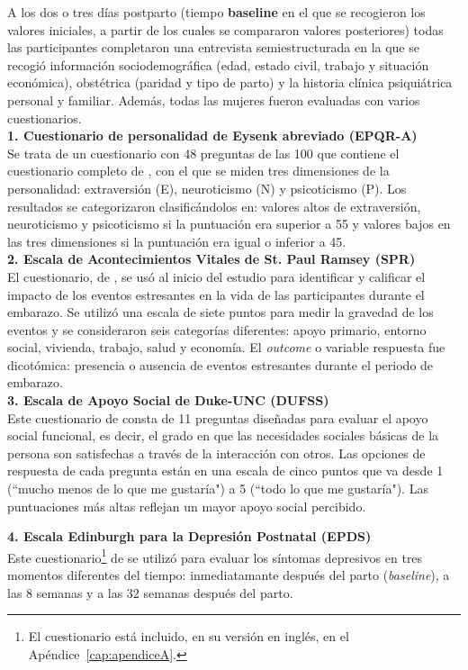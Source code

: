 A los dos o tres días postparto (tiempo \textbf{baseline} en el que se recogieron los valores iniciales, a partir de los cuales se compararon valores posteriores) todas las participantes completaron una entrevista semiestructurada en la que se recogió información sociodemográfica (edad, estado civil, trabajo y situación económica), obstétrica (paridad y tipo de parto) y la historia clínica psiquiátrica personal y familiar. Además, todas las mujeres fueron evaluadas con varios cuestionarios.\\

\textbf{1. Cuestionario de personalidad de Eysenk abreviado (EPQR-A) }\\
[0.3cm]
Se trata de un cuestionario con 48 preguntas de las 100 que contiene el cuestionario completo de \textcite{cuest1}, con el que se miden tres dimensiones de la personalidad: extraversión (E), neuroticismo (N) y psicoticismo (P). Los resultados se categorizaron clasificándolos en: valores altos de extraversión, neuroticismo y psicoticismo si la puntuación era superior a 55 y valores bajos en las tres dimensiones si la puntuación era igual o inferior a 45.\\

\textbf{2. Escala de Acontecimientos Vitales de St. Paul Ramsey (SPR) }\\
[0.3cm]
El cuestionario, de \textcite{cuest2}, se usó al inicio del estudio para identificar y calificar el impacto de los eventos estresantes en la vida de las participantes durante el embarazo. Se utilizó una escala de siete puntos para medir la gravedad de los eventos y se consideraron seis categorías diferentes: apoyo primario, entorno social, vivienda, trabajo, salud y economía. El \textit{outcome} o variable respuesta fue dicotómica: presencia o ausencia de eventos estresantes durante el periodo de embarazo. \\

\textbf{3. Escala de Apoyo Social de Duke-UNC (DUFSS)}\\
[0.3cm]
Este cuestionario de \textcite{cuest3} consta de 11 preguntas diseñadas para evaluar el apoyo social funcional, es decir, el grado en que las necesidades sociales básicas de la persona son satisfechas a través de la interacción con otros. Las opciones de respuesta de cada pregunta están en una escala de cinco puntos que va desde 1 (``mucho menos de lo que me gustaría") a 5 (``todo lo que me gustaría"). Las puntuaciones más altas reflejan un mayor apoyo social percibido.

\textbf{4. Escala Edinburgh para la Depresión Postnatal (EPDS) }\\
[0.3cm]
Este cuestionario\footnote{El cuestionario está incluido, en su versión en inglés, en el Apéndice~\ref{cap:apendiceA}.} de \textcite{cuest4} se utilizó para evaluar los síntomas depresivos en tres momentos diferentes del tiempo: inmediatamante después del parto (\textit{baseline}), a las 8 semanas y a las 32 semanas después del parto.\\

